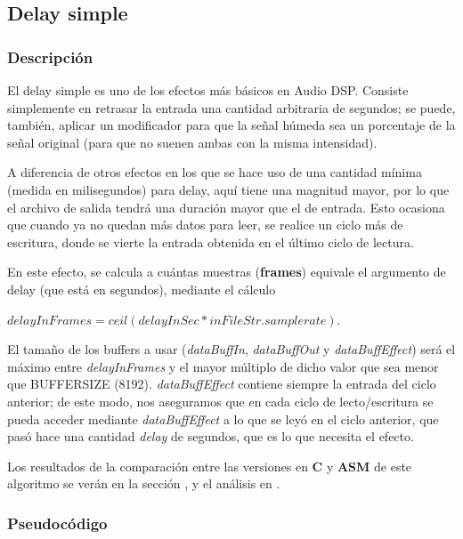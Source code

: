 \subsection{Delay simple}
\label{subsec:desarrollo-delay}

\subsubsection{Descripción}
\label{subsec:desarrollo-delay-desc}

El delay simple es uno de los efectos más básicos en Audio DSP. Consiste simplemente en retrasar la entrada una cantidad arbitraria de segundos; se puede, también, aplicar un modificador para que la señal húmeda sea un porcentaje de la señal original (para que no suenen ambas con la misma intensidad).

A diferencia de otros efectos en los que se hace uso de una cantidad mínima (medida en milisegundos) para delay, aquí tiene una magnitud mayor, por lo que el archivo de salida tendrá una duración mayor que el de entrada. Esto ocasiona que cuando ya no quedan más datos para leer, se realice un ciclo más de escritura, donde se vierte la entrada obtenida en el último ciclo de lectura.

En este efecto, se calcula a cuántas muestras (\textbf{frames}) equivale el argumento de delay (que está en segundos), mediante el cálculo
\begin{center}$delayInFrames = ceil(delayInSec*inFileStr.samplerate)$.\end{center}

El tamaño de los buffers a usar (\textit{dataBuffIn}, \textit{dataBuffOut} y \textit{dataBuffEffect}) será el máximo entre \textit{delayInFrames} y el mayor múltiplo de dicho valor que sea menor que BUFFERSIZE (8192). \textit{dataBuffEffect} contiene siempre la entrada del ciclo anterior; de este modo, nos aseguramos que en cada ciclo de lecto/escritura se pueda acceder mediante \textit{dataBuffEffect} a lo que se leyó en el ciclo anterior, que pasó hace una cantidad \textit{delay} de segundos, que es lo que necesita el efecto.

\vspace{\baselineskip}

Los resultados de la comparación entre las versiones en \textbf{C} y \textbf{ASM} de este algoritmo se verán en la sección , y el análisis en .

\subsubsection{Pseudocódigo}
\label{subsec:desarrollo-delay-code}

